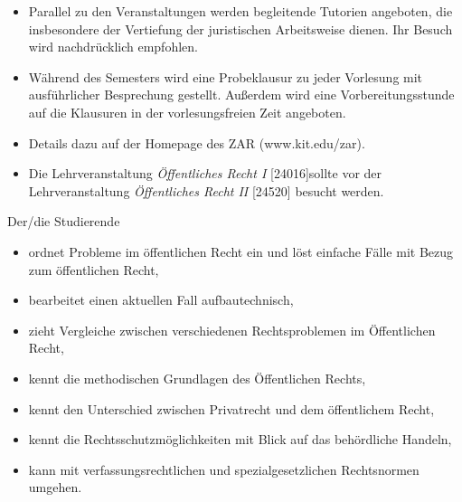 \begin{module}
\begin{styleenv}
\begin{recommendations}\begin{itemize}\item Parallel zu den Veranstaltungen werden begleitende Tutorien angeboten, die insbesondere der Vertiefung der juristischen Arbeitsweise dienen. Ihr Besuch wird nachdrücklich empfohlen.  \item Während des Semesters wird eine Probeklausur zu jeder Vorlesung mit ausführlicher Besprechung gestellt. Außerdem wird eine Vorbereitungsstunde auf die Klausuren in der vorlesungsfreien Zeit angeboten.  \item Details dazu auf der Homepage des ZAR (www.kit.edu/zar).  \item Die Lehrveranstaltung \emph{Öffentliches Recht I} [24016]sollte vor der Lehrveranstaltung \emph{Öffentliches Recht II} [24520] besucht werden.  \end{itemize}\end{recommendations}
\end{styleenv}

\begin{learningoutcomes}
Der/die Studierende

 \begin{itemize}\item ordnet Probleme im öffentlichen Recht ein und löst einfache Fälle mit Bezug zum öffentlichen Recht,  \item bearbeitet einen aktuellen Fall aufbautechnisch,  \item zieht Vergleiche zwischen verschiedenen Rechtsproblemen im Öffentlichen Recht,  \item kennt die methodischen Grundlagen des Öffentlichen Rechts,  \item kennt den Unterschied zwischen Privatrecht und dem öffentlichem Recht,  \item kennt die Rechtsschutzmöglichkeiten mit Blick auf das behördliche Handeln,  \item kann mit verfassungsrechtlichen und spezialgesetzlichen Rechtsnormen umgehen.  \end{itemize}
\end{learningoutcomes}


\end{module}
